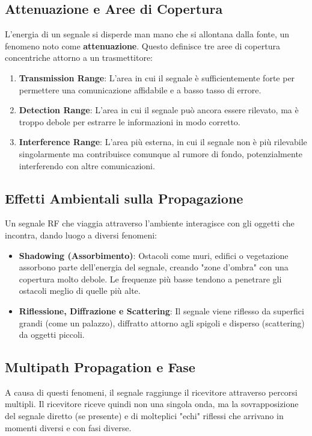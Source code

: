 \subsection{Attenuazione e Aree di Copertura}
L'energia di un segnale si disperde man mano che si allontana dalla fonte, un fenomeno noto come \textbf{attenuazione}. Questo definisce tre aree di copertura concentriche attorno a un trasmettitore:
\begin{enumerate}
    \item \textbf{Transmission Range}: L'area in cui il segnale è sufficientemente forte per permettere una comunicazione affidabile e a basso tasso di errore.
    \item \textbf{Detection Range}: L'area in cui il segnale può ancora essere rilevato, ma è troppo debole per estrarre le informazioni in modo corretto.
    \item \textbf{Interference Range}: L'area più esterna, in cui il segnale non è più rilevabile singolarmente ma contribuisce comunque al rumore di fondo, potenzialmente interferendo con altre comunicazioni.
\end{enumerate}


\subsection{Effetti Ambientali sulla Propagazione}
Un segnale RF che viaggia attraverso l'ambiente interagisce con gli oggetti che incontra, dando luogo a diversi fenomeni:
\begin{itemize}
    \item \textbf{Shadowing (Assorbimento)}: Ostacoli come muri, edifici o vegetazione assorbono parte dell'energia del segnale, creando "zone d'ombra" con una copertura molto debole. Le frequenze più basse tendono a penetrare gli ostacoli meglio di quelle più alte.
    \item \textbf{Riflessione, Diffrazione e Scattering}: Il segnale viene riflesso da superfici grandi (come un palazzo), diffratto attorno agli spigoli e disperso (scattering) da oggetti piccoli.
\end{itemize}

\subsection{Multipath Propagation e Fase}
A causa di questi fenomeni, il segnale raggiunge il ricevitore attraverso percorsi multipli. Il ricevitore riceve quindi non una singola onda, ma la sovrapposizione del segnale diretto (se presente) e di molteplici "echi" riflessi che arrivano in momenti diversi e con fasi diverse.

